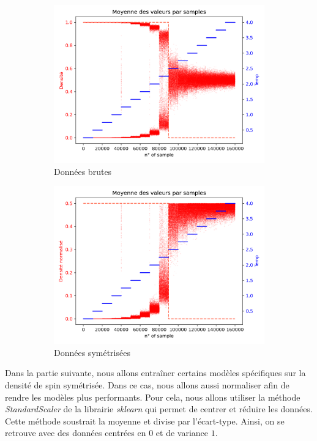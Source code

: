 \documentclass[11pt, parskip=half]{scrartcl} %
\begin{document}
\begin{figure}[h]
	\begin{subfigure}{0.5\textwidth}
		\includegraphics[width=0.95\linewidth]{./figures/raw_data.png}
		\caption{Données brutes}
		\label{fig:rawdata}
	\end{subfigure}
	\begin{subfigure}{0.5\textwidth}
		\includegraphics[width=0.95\linewidth]{./figures/sym_data.png}
		\caption{Données symétrisées}
		\label{fig:symdata}
	\end{subfigure}
	\caption{}
\end{figure}

Dans la partie suivante, nous allons entraîner certains modèles spécifiques sur la densité de spin symétrisée. Dans ce cas, nous allons aussi normaliser afin de rendre les modèles plus performants.
Pour cela, nous allons utiliser la méthode \textit{StandardScaler} de la librairie \textit{sklearn} qui permet de centrer et réduire les données. Cette méthode soustrait la moyenne et divise par l'écart-type. Ainsi, on se retrouve avec des données centrées en $0$ et de variance $1$.
\end{document}
